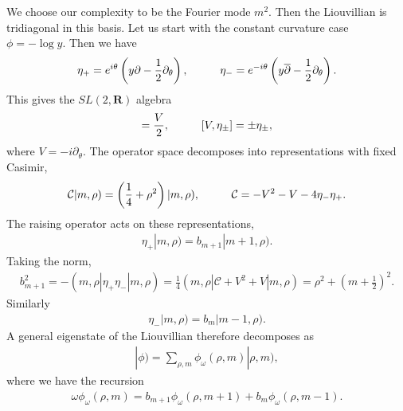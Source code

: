 \documentclass[JHEP,12pt]{article}
\begin{document}
\indent We choose our complexity to be the Fourier mode $m^2$. Then the Liouvillian is tridiagonal in this basis. Let us start with the constant curvature case $\phi=-\log y$. Then we have 
\begin{align}
\eta_+=e^{i\theta}\left(y\partial-\frac{1}{2}\partial_\theta\right),\hspace{10 mm}\eta_-=e^{-i\theta}\left(y\overline{\partial}-\frac{1}{2}\partial_\theta\right).
\end{align}
This gives the $SL(2,\mathbf{R})$ algebra 
\begin{align}
[\eta_+,\eta_-]=\frac{V}{2} ,\hspace{10 mm}[V,\eta_{\pm}]=\pm \eta_{\pm},
\end{align}
where $V=-i\partial_\theta$. The operator space decomposes into representations with fixed Casimir, 
\begin{align}
\mathcal{C}|m,\rho)=\left(\frac{1}{4}+\rho^2\right)|m,\rho),\hspace{10 mm}\mathcal{C}=-V^2-V-4\eta_{-}\eta_+.
\end{align}
The raising operator acts on these representations, 
\begin{align*}
\eta_+|m,\rho)=b_{m+1}|m+1,\rho). 
\end{align*}
Taking the norm, 
\begin{align}
b_{m+1}^2=-(m,\rho|\eta_+\eta_-|m,\rho)=\frac{1}{4}(m,\rho|\mathcal{C}+V^2+V|m,\rho)=\rho^2+\left(m+\frac{1}{2}\right)^2.
\end{align}
Similarly 
\begin{align}
\eta_-|m,\rho)=b_m|m-1,\rho).
\end{align}
A general eigenstate of the Liouvillian therefore decomposes as
\begin{align}
|\phi)=\sum_{\rho,m}\phi_\omega(\rho,m)|\rho,m),
\end{align}
where we have the recursion 
\begin{align}
\omega\phi_\omega(\rho,m)=b_{m+1}\phi_\omega(\rho,m+1)+b_m\phi_\omega(\rho,m-1).
\end{align}
\end{document}
